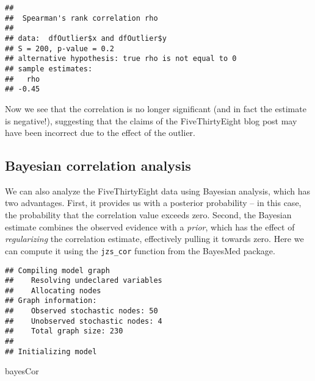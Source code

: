\documentclass[]{book}
\newenvironment{Shaded}{\begin{snugshade}}{\end{snugshade}}
\newcommand{\KeywordTok}[1]{\textcolor[rgb]{0.13,0.29,0.53}{\textbf{#1}}}
\newcommand{\StringTok}[1]{\textcolor[rgb]{0.31,0.60,0.02}{#1}}
\newcommand{\OperatorTok}[1]{\textcolor[rgb]{0.81,0.36,0.00}{\textbf{#1}}}
\newcommand{\NormalTok}[1]{#1}
\theoremstyle{definition}
\theoremstyle{definition}
\theoremstyle{definition}
\theoremstyle{remark}
\begin{document}
\begin{verbatim}
## 
##  Spearman's rank correlation rho
## 
## data:  dfOutlier$x and dfOutlier$y
## S = 200, p-value = 0.2
## alternative hypothesis: true rho is not equal to 0
## sample estimates:
##   rho 
## -0.45
\end{verbatim}

Now we see that the correlation is no longer significant (and in fact
the estimate is negative!), suggesting that the claims of the
FiveThirtyEight blog post may have been incorrect due to the effect of
the outlier.

\subsection{Bayesian correlation
analysis}\label{bayesian-correlation-analysis}

We can also analyze the FiveThirtyEight data using Bayesian analysis,
which has two advantages. First, it provides us with a posterior
probability -- in this case, the probability that the correlation value
exceeds zero. Second, the Bayesian estimate combines the observed
evidence with a \emph{prior}, which has the effect of
\emph{regularizing} the correlation estimate, effectively pulling it
towards zero. Here we can compute it using the \texttt{jzs\_cor}
function from the BayesMed package.

\begin{Shaded}
\end{Shaded}

\begin{verbatim}
## Compiling model graph
##    Resolving undeclared variables
##    Allocating nodes
## Graph information:
##    Observed stochastic nodes: 50
##    Unobserved stochastic nodes: 4
##    Total graph size: 230
## 
## Initializing model
\end{verbatim}

\begin{Shaded}
\begin{Highlighting}[]
\NormalTok{bayesCor}
\end{Highlighting}
\end{Shaded}
\end{document}
